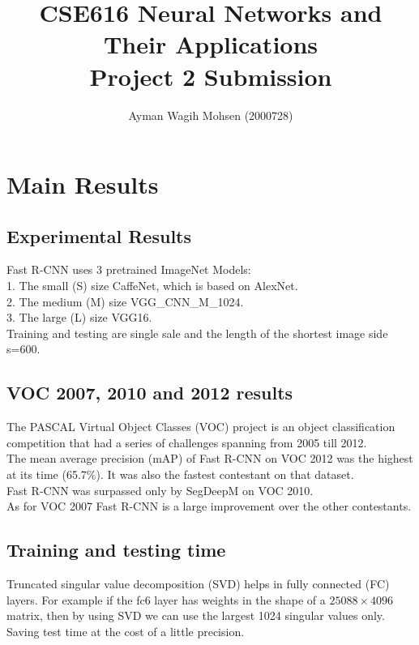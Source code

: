 \documentclass[10pt]{article}
\begin{document}
\title{CSE616 Neural Networks and Their Applications\\
Project 2 Submission}
\author{Ayman Wagih Mohsen (2000728)}
\maketitle

\setcounter{section}{3}
\section{Main Results}

\subsection{Experimental Results}
Fast R-CNN uses 3 pretrained ImageNet Models:\\
1. The small (S) size CaffeNet, which is based on AlexNet.\\
2. The medium (M) size VGG\_CNN\_M\_1024.\\
3. The large (L) size VGG16.\\
Training and testing are single sale and the length of the shortest image side s=600.

\subsection{VOC 2007, 2010 and 2012 results}
The PASCAL Virtual Object Classes (VOC) project is an object classification competition that had a series of challenges spanning from 2005 till 2012.\\
The mean average precision (mAP) of Fast R-CNN on VOC 2012 was the highest at its time (65.7\%). It was also the fastest contestant on that dataset.\\
Fast R-CNN was surpassed only by SegDeepM on VOC 2010.\\
As for VOC 2007 Fast R-CNN is a large improvement over the other contestants.

\subsection{Training and testing time}

Truncated singular value decomposition (SVD) helps in fully connected (FC) layers. For example if the fc6 layer has weights in the shape of a $25088\times4096$ matrix, then by using SVD we can use the largest 1024 singular values only. Saving test time at the cost of a little precision.
\end{document}
